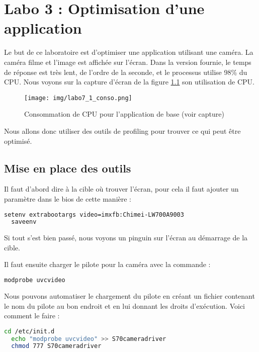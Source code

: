 \chapter{Labo 3 : Optimisation d'une application}

Le but de ce laboratoire est d'optimiser une application utilisant une caméra. La caméra filme et l'image est affichée sur l'écran. Dans la version fournie, le temps de réponse est très lent, de l'ordre de la seconde, et le processus utilise  98\% du CPU. Nous voyons sur la capture d'écran de la figure \ref{labo7_1_conso} son utilisation de CPU.

\begin{figure}[h]
  \centering
    \texttt{[image: img/labo7\_1\_conso.png]}
  \caption{Consommation de CPU pour l'application de base (voir capture)}
  \label{labo7_1_conso}
\end{figure}

\noindent Nous allons donc utiliser des outils de profiling pour trouver ce qui peut être optimisé.

\newpage

\section{Mise en place des outils}

Il faut d'abord dire à la cible où trouver l'écran, pour cela il faut ajouter un paramètre dans le bios de cette manière :

\begin{lstlisting}[language=bash]
  setenv extrabootargs video=imxfb:Chimei-LW700A9003
  saveenv
\end{lstlisting}

\noindent Si tout s'est bien passé, nous voyons un pinguin sur l'écran au démarrage de la cible.

\noindent Il faut ensuite charger le pilote pour la caméra avec la commande :

\begin{lstlisting}[language=bash]
  modprobe uvcvideo
\end{lstlisting}

Nous pouvons automatiser le chargement du pilote en créant un fichier contenant le nom du pilote au bon endroit et en lui donnant les droits d'exécution. Voici comment le faire :

\begin{lstlisting}[language=bash]
  cd /etc/init.d
  echo "modprobe uvcvideo" >> S70cameradriver
  chmod 777 S70cameradriver
\end{lstlisting}

